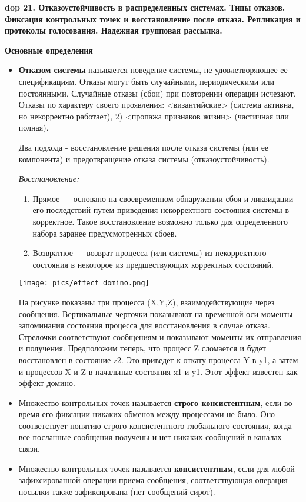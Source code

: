 \textbf{\LARGE dop 21. Отказоустойчивость  в  распределенных  системах.  Типы  отказов.  Фиксация  контрольных  точек  и восстановление после отказа. Репликация и протоколы голосования. Надежная групповая рассылка.}

\textbf{Основные определения}

\begin{itemize}
    \item \textbf{Отказом системы} называется поведение системы, не удовлетворяющее ее спецификациям.
    Отказы могут быть случайными, периодическими или постоянными. 
    Случайные отказы (сбои) при повторении операции исчезают. 
    Отказы по характеру своего проявления: <византийские> (система активна, но некорректно работает), 2) <пропажа признаков жизни> (частичная или полная). 
    
    Два подхода - восстановление решения после отказа системы (или ее компонента) и предотвращение отказа системы (отказоустойчивость).
    
    \textit{Восстановление:}
    \begin{enumerate}
        \item Прямое --- основано на своевременном обнаружении сбоя и ликвидации его последствий путем приведения некорректного состояния системы в корректное. 
        Такое восстановление возможно только для определенного набора заранее предусмотренных сбоев.
        \item Возвратное --- возврат процесса (или системы) из некорректного состояния в некоторое из предшествующих корректных состояний.
    \end{enumerate}
    
    \texttt{[image: pics/effect\_domino.png]}
    
    На рисунке показаны три процесса (X,Y,Z), взаимодействующие через сообщения. Вертикальные черточки показывают на временной оси моменты запоминания состояния процесса для восстановления в случае отказа. Стрелочки соответствуют сообщениям и показывают моменты их отправления и получения. Предположим теперь, что процесс Z сломается и будет восстановлен в состояние z2. Это приведет к откату процесса Y в y1, а затем и процессов X и Z в начальные состояния x1 и y1. Этот эффект известен как эффект домино.
    
    \item Множество контрольных точек называется \textbf{строго консистентным}, если во время его фиксации никаких обменов между процессами не было. 
    Оно соответствует понятию строго консистентного глобального состояния, когда все посланные сообщения получены и нет никаких сообщений в каналах связи.
    \item Множество контрольных точек называется \textbf{консистентным}, если для любой зафиксированной операции приема сообщения, соответствующая операция посылки также зафиксирована (нет сообщений-сирот).
\end{itemize}

